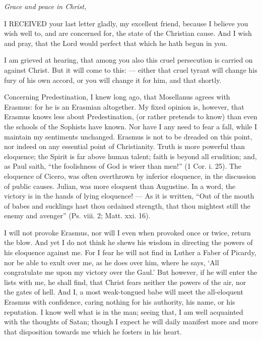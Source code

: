
\emph{Grace and peace in Christ,}

I \textsc{RECEIVED} your last letter gladly, my excellent friend, because I believe you wish well to, and are concerned for, the state of the Christian cause. And I wish and pray, that the Lord would perfect that which he hath begun in you.

I am grieved at hearing, that among you also this cruel persecution is carried on against Christ. But it will come to this: — either that cruel tyrant will change his fury of his own accord, or you will change it for him, and that shortly.

Concerning Predestination, I knew long ago, that Mosellanus agrees with Erasmus: for he is an Erasmian altogether. My fixed opinion is, however, that Erasmus knows less about Predestination, (or rather pretends to know) than even the schools of the Sophists have known. Nor have I any need to fear a fall, while I maintain my sentiments unchanged. Erasmus is not to be dreaded on this point, nor indeed on any essential point of Christianity. Truth is more powerful than eloquence; the Spirit is far above human talent; faith is beyond all erudition; and, as Paul saith, “the foolishness of God is wiser than men!” (1 Cor. i. 25). The eloquence of Cicero, was often overthrown by inferior eloquence, in the discussion of public causes. Julian, was more eloquent than Augustine. In a word, the victory is in the hands of lying eloquence! — As it is written, “Out of the mouth of babes and sucklings hast thou ordained strength, that thou mightest still the enemy and avenger” (Ps. viii. 2; Matt. xxi. 16).

I will not provoke Erasmus, nor will I even when provoked once or twice, return the blow. And yet I do not think he shews his wisdom in directing the powers of his eloquence against me. For I fear he will not find in Luther a Faber of Picardy, nor be able to exult over me, as he does over him, where he says, ‘All congratulate me upon my victory over the Gaul.’ But however, if he will enter the lists with me, he shall find, that Christ fears neither the powers of the air, nor the gates of hell. And I, a most weak-tongued babe will meet the all-eloquent Erasmus with confidence, caring nothing for his authority, his name, or his reputation. I know well what is in the man; seeing that, I am well acquainted with the thoughts of Satan; though I expect he will daily manifest more and more that disposition towards me which he fosters in his heart.

